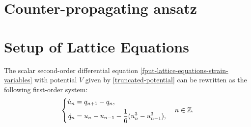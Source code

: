 \section{Counter-propagating ansatz}




\section{Setup of Lattice Equations}

The scalar second-order differential equation \cref{fput-lattice-equations-strain-variables} with potential \(V\) given by \cref{truncated-potential} can be rewritten as the following first-order system:
\begin{equation}\label{first-order-lattice-eqns}
	\left\{\begin{aligned}\dot u _n &= q_{n+1} - q_n, \\
	\dot q_n &= u_n - u_{n-1} - \frac{1} 6 ( u_n^3 - u^3_{n-1}),\end{aligned} \right. \quad n \in \mathbb{Z}.
\end{equation}







